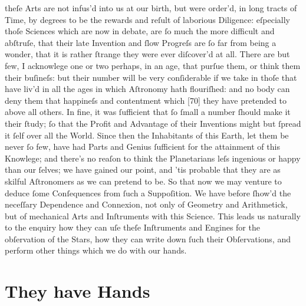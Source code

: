 \documentclass[letterpaper]{book}
\begin{document}
theſe Arts are not infus'd into us at our birth, but were order'd, in long
tracts of Time, by degrees to be the rewards and reſult of laborious
Diligence: eſpecially thoſe Sciences which are now in debate, are ſo much
the more difficult and abſtruſe, that their late Invention and ſlow Progreſs
are ſo far from being a wonder, that it is rather ſtrange they were ever
diſcover'd at all. There are but few, I acknowlege one or two perhaps, in an
age, that purſue them, or think them their buſineſs: but their number will
be very conſiderable if we take in thoſe that have liv'd in all the ages in
which Aſtronomy hath flouriſhed: and no body can deny them that happineſs
and contentment which [70] they have pretended to above all others. In fine,
it was ſufficient that ſo ſmall a number ſhould make it their ſtudy; ſo that
the Profit and Advantage of their Inventions might but ſpread it ſelf over
all the World. Since then the Inhabitants of this Earth, let them be never
ſo few, have had Parts and Genius ſufficient for the attainment of this
Knowlege; and there's no reaſon to think the Planetarians leſs ingenious or
happy than our ſelves; we have gained our point, and 'tis probable that they
are as skilful Aſtronomers as we can pretend to be. So that now we may
venture to deduce ſome Conſequences from ſuch a Suppoſition.  We have before
ſhow'd the neceſſary Dependence and Connexion, not only of Geometry and
Arithmetick, but of mechanical Arts and Inſtruments with this Science. This
leads us naturally to the enquiry how they can uſe theſe Inſtruments and
Engines for the obſervation of the Stars, how they can write down ſuch their
Obſervations, and perform other things which we do with our hands.


\section{They have Hands}
\end{document}
